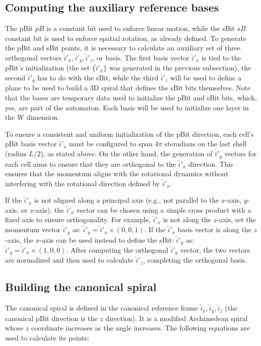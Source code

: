 \documentclass[12pt,english]{article}
\begin{document}
\subsection{Computing the auxiliary reference bases}
The pBit $pB$ is a constant bit used to enforce linear motion, while the sBit $sB$ constant bit is used to enforce spatial rotation, as already defined. To generate the pBit and sBit points, it is necessary to calculate an auxiliary set of three orthogonal vectors $\hat{i}'_x,\hat{i}'_y,\hat{i}'_z$, or basis. The first basis vector $\hat{i}'_x$ is tied to the pBit's initialization (the set $\{\hat{i}'_x\}$ was generated in the previous subsection), the second $\hat{i}'_y$ has to do with the sBit, while the third $\hat{i}'_z$ will be used to define a plane to be used to build a 3D spiral that defines the sBit bits themselves. Note that the bases are temporary data used to initialize the pBit and sBit bits, which, yes, are part of the automaton. Each basis will be used to initialize one layer in the W dimension.

To ensure a consistent and uniform initialization of the pBit direction, each cell's pBit basis vector $\hat{i}'_x$ must be configured to span $4\pi$ steradians on the last shell (radius $L/2$), as stated above. On the other hand, the generation of $\hat{i}'_y$ vectors for each cell aims to ensure that they are orthogonal to the $\hat{i}'_x$ direction. This ensures that the momentum aligns with the rotational dynamics without interfering with the rotational direction defined by $\hat{i}'_x$.

If the $\hat{i}'_x$ is not aligned along a principal axis (e.g., not parallel to the $x$-axis, $y$-axis, or $z$-axis), the $\hat{i}'_x$ vector can be chosen using a simple cross product with a fixed axis to ensure orthogonality. For example, $\hat{i}'_x$ is not along the $z$-axis, set the momentum vector $\hat{i}'_y$ as: $\hat{i}'_y=\hat{i}'_x\times(0,0,1)$. If the $\hat{i}'_x$ basis vector is along the $z$-axis, the $x$-axis can be used instead to define the sBit: $\hat{i}'_y$ as: $\hat{i}'_y=\hat{i}'_x\times(1,0,0)$. After computing the orthogonal $\hat{i}'_y$ vector, the two vectors are normalized and then used to calculate $\hat{i}'_z$, completing the orthogonal basis.

\subsection{Building the canonical spiral}

The canonical spiral is defined in the canonical reference frame $\hat{i}_x, \hat{i}_y, \hat{i}_z$ (the canonical pBit direction is the $z$ direction). It is a modified Archimedean spiral whose $z$ coordinate increases as the angle increases. The following equations are used to calculate its points:
\end{document}
